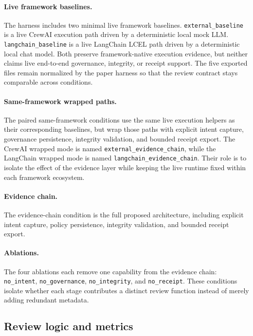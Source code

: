 \paragraph{Live framework baselines.}
The harness includes two minimal live framework baselines. \texttt{external\_baseline} is a live CrewAI execution path driven by a deterministic local mock LLM. \texttt{langchain\_baseline} is a live LangChain LCEL path driven by a deterministic local chat model. Both preserve framework-native execution evidence, but neither claims live end-to-end governance, integrity, or receipt support. The five exported files remain normalized by the paper harness so that the review contract stays comparable across conditions.

\paragraph{Same-framework wrapped paths.}
The paired same-framework conditions use the same live execution helpers as their corresponding baselines, but wrap those paths with explicit intent capture, governance persistence, integrity validation, and bounded receipt export. The CrewAI wrapped mode is named \texttt{external\_evidence\_chain}, while the LangChain wrapped mode is named \texttt{langchain\_evidence\_chain}. Their role is to isolate the effect of the evidence layer while keeping the live runtime fixed within each framework ecosystem.

\paragraph{Evidence chain.}
The evidence-chain condition is the full proposed architecture, including explicit intent capture, policy persistence, integrity validation, and bounded receipt export.

\paragraph{Ablations.}
The four ablations each remove one capability from the evidence chain:
\texttt{no\_intent}, \texttt{no\_governance}, \texttt{no\_integrity}, and \texttt{no\_receipt}. These conditions isolate whether each stage contributes a distinct review function instead of merely adding redundant metadata.

\subsection{Review logic and metrics}

